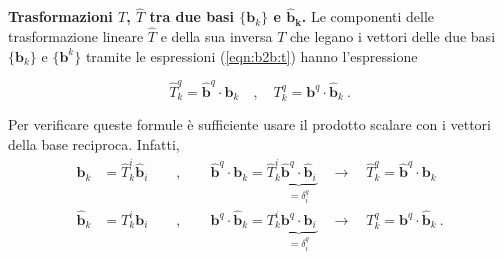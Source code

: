 \vspace{5pt} \noindent
\textbf{Trasformazioni \textnormal{$T$}, \textnormal{$\hat{T}$} tra due basi $\{\bm{b}_k\}$ e $\bm{\hat{b}_k}$.} 
Le componenti delle trasformazione lineare $\hat{T}$ e della sua inversa $T$ che legano i vettori delle due basi $\{\bm{b}_k\}$ e $\{\bm{b}^k\}$ tramite le espressioni (\ref{eqn:b2b:t}) hanno l'espressione
\begin{fBox}
\begin{equation}
  \hat{T}^q_k = \bm{\hat{b}}^q \cdot \bm{b}_k \quad , \quad T^q_k = \bm{b}^q \cdot \bm{\hat{b}}_k \ .
\end{equation}
\end{fBox}
Per verificare queste formule è sufficiente usare il prodotto scalare con i vettori della base reciproca. Infatti,
\begin{equation}
\begin{aligned}
 \bm{b}_k & = \hat{T}^i_k \bm{\hat{b}}_i \qquad , \qquad 
 \bm{\hat{b}}^q \cdot \bm{b}_k = \hat{T}^i_k \underbrace{\bm{\hat{b}}^q \cdot \bm{\hat{b}}_i}_{=\delta^q_i} \quad \rightarrow  \quad \hat{T}^q_k = \bm{\hat{b}}^q \cdot \bm{b}_k \\
 \bm{\hat{b}}_k & = {T}^i_k \bm{b}_i \qquad , \qquad 
 \bm{b}^q \cdot \bm{\hat{b}}_k = T^i_k \underbrace{\bm{b}^q \cdot \bm{b}_i}_{=\delta^q_i} \quad \rightarrow  \quad T^q_k = \bm{b}^q \cdot \bm{\hat{b}}_k \ .
\end{aligned} 
\end{equation}

